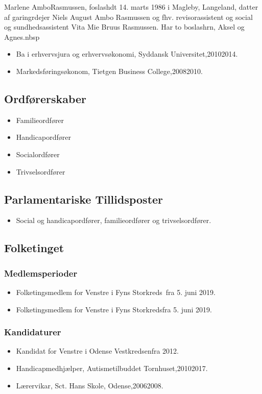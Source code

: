 \documentclass[11pt, a4paper]{awesome-cv}
\begin{document}
\makecvheader[R]
\makelettertitle
\begin{cvletter}
Marlene AmboRasmussen, foslashdt 14. marts 1986 i Magleby, Langeland, datter af garingrdejer Niels August Ambo Rasmussen og fhv. revisorassistent og social og sundhedsassistent Vita Mie Bruus Rasmussen. Har to boslashrn, Aksel og Agnes.nbsp

\begin{itemize}
\item Ba i erhvervsjura og erhvervsøkonomi, Syddansk Universitet,20102014.
\item Markedsføringsøkonom, Tietgen Business College,20082010.
\end{itemize}
\subsection*{Ordførerskaber}
\begin{itemize}
\item Familieordfører
\item Handicapordfører
\item Socialordfører
\item Trivselsordfører
\end{itemize}
\subsection*{Parlamentariske Tillidsposter}
\begin{itemize}
\item Social og handicapordfører, familieordfører og trivselsordfører.
\end{itemize}
\subsection*{Folketinget}
\subsubsection*{Medlemsperioder}
\begin{itemize}
\item Folketingsmedlem for Venstre i Fyns Storkreds fra 5. juni 2019.
\item Folketingsmedlem for Venstre i Fyns Storkredsfra 5. juni 2019.
\end{itemize}
\subsubsection*{Kandidaturer}
\begin{itemize}
\item Kandidat for Venstre i Odense Vestkredsenfra 2012.
\end{itemize}
\begin{itemize}
\item Handicapmedhjælper, Autismetilbuddet Tornhuset,20102017.
\item Lærervikar, Sct. Hans Skole, Odense,20062008.
\end{itemize}
\end{cvletter}
\end{document}
